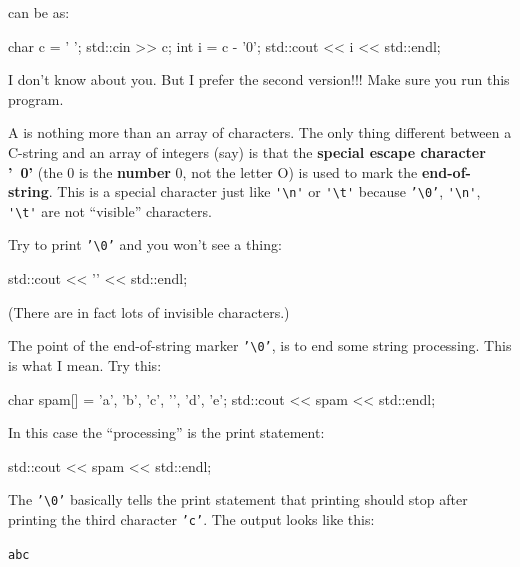 can be  as:

\begin{consolethree}[escapeinside=||]
char c = ' ';
std::cin >> c;
int i = c - '0';
std::cout << i << std::endl;
\end{consolethree}

I don't know about you. But I prefer the second version!!! Make sure you run this program.




\newpage{}

A  is nothing more than an array of characters. The only thing different between a C-string and an array of integers (say) is that the \textbf{special escape character '\ 0'} (the 0 is the \textbf{number} 0, not the letter O) is used to mark the \textbf{end-of-string}. This is a special character just like \verb!'\n'! or \verb!'\t'! because \texttt{'\textbackslash 0'}, \verb!'\n'!, \verb!'\t'! are not ``visible'' characters.

Try to print \texttt{'\textbackslash 0'} and you won't see a thing:

\begin{consolethree}[escapeinside=||]
std::cout << '\0' << std::endl;
\end{consolethree}

(There are in fact lots of invisible characters.)

The point of the end-of-string marker \texttt{'\textbackslash 0'}, is to end some string processing. This is what I mean. Try this:

\begin{consolethree}[escapeinside=||]
char spam[] = {'a', 'b', 'c', '\0', 'd', 'e'};
std::cout << spam << std::endl;
\end{consolethree}

In this case the ``processing'' is the print statement:

\begin{consolethree}[escapeinside=||]
std::cout << spam << std::endl;
\end{consolethree}

The \texttt{'\textbackslash 0'} basically tells the print statement that printing should stop after printing the third character \texttt{'c'}. The output looks like this:

\begin{center}
\texttt{abc}
\end{center}

